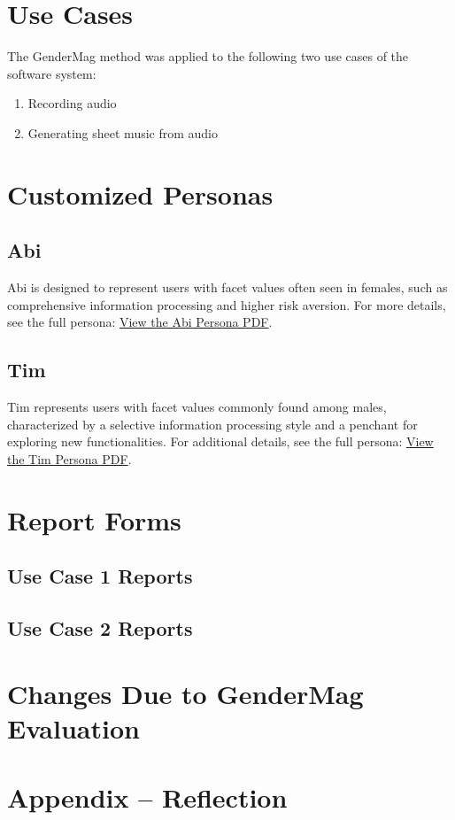 \documentclass[12pt, titlepage]{article}
\begin{document}
\section{Use Cases}
The GenderMag method was applied to the following two use cases of the software system:
\begin{enumerate}
    \item Recording audio
    \item Generating sheet music from audio
\end{enumerate}

\section{Customized Personas}
\subsection{Abi}
Abi is designed to represent users with facet values often seen in females, such as comprehensive 
information processing and higher risk aversion. For more details, see the full persona:
\href{personas/abi.pdf}{View the Abi Persona PDF}.

\subsection{Tim}
Tim represents users with facet values commonly found among males, characterized by a selective 
information processing style and a penchant for exploring new functionalities. For additional 
details, see the full persona:
\href{personas/tim.pdf}{View the Tim Persona PDF}.

\section{Report Forms}
\subsection{Use Case 1 Reports}



\subsection{Use Case 2 Reports}




\section{Changes Due to GenderMag Evaluation}


\newpage
\section*{Appendix -- Reflection}
\end{document}
